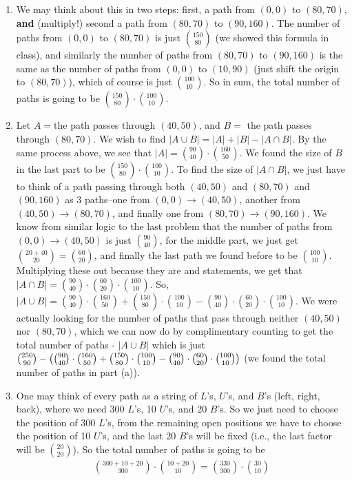 \documentclass[12pt]{article}
\theoremstyle{definition}
\theoremstyle{remark}
\begin{document}
\begin{enumerate}[leftmargin=\labelsep]
\begin{enumerate}
			\item We may think about this in two steps: first, a path from $(0, 0)$ to $(80, 70)$, \textbf{and} (multiply!) second a path from $(80, 70)$ to $(90, 160)$. The number of paths from $(0, 0)$ to $(80, 70)$ is just ${150 \choose 80}$ (we showed this formula in class), and similarly the number of paths from $(80, 70)$ to $(90, 160)$ is the same as the number of paths from $(0, 0)$ to $(10, 90)$ (just shift the origin to $(80, 70)$), which of course is just ${100 \choose 10}$. So in sum, the total number of paths is going to be ${150 \choose 80} \cdot {100 \choose 10}$.
			
			\item Let $A = $the path passes through $(40, 50)$, and $B =$ the path passes through $(80, 70)$. We wish to find $|A \cup B| = |A| + |B| - |A \cap B|$. By the same process above, we see that $|A| = {90 \choose 40} \cdot {160 \choose 50}$. We found the size of $B$ in the last part to be ${150 \choose 80} \cdot {100 \choose 10}$. To find the size of $|A \cap B|$, we just have to think of a path passing through both $(40, 50)$ and $(80, 70)$ and $(90, 160)$ as 3 paths--one from $(0, 0) \to (40, 50)$, another from $(40, 50) \to (80, 70)$, and finally one from $(80, 70) \to (90, 160)$. We know from similar logic to the last problem that the number of paths from $(0, 0) \to (40, 50)$ is just $90 \choose 40$, for the middle part, we just get ${20+40 \choose 20} = {60 \choose 20}$, and finally the last path we found before to be ${100 \choose 10}$. Multiplying these out because they are and statements, we get that $|A \cap B| = {90 \choose 40} \cdot {60 \choose 20} \cdot {100 \choose 10}$. So, $|A \cup B| = {90 \choose 40} \cdot {160 \choose 50} + {150 \choose 80} \cdot {100 \choose 10} - {90 \choose 40} \cdot {60 \choose 20} \cdot {100 \choose 10}$. We were actually looking for the number of paths that pass through neither $(40, 50)$ nor $(80, 70)$, which we can now do by complimentary counting to get the total number of paths - $|A \cup B|$ which is just ${250 \choose 90} - \qty({90 \choose 40} \cdot {160 \choose 50} + {150 \choose 80} \cdot {100 \choose 10} - {90 \choose 40} \cdot {60 \choose 20} \cdot {100 \choose 10})$ (we found the total number of paths in part (a)).
		
			\item One may think of every path as a string of $L$'s, $U$'s, and $B$'s (left, right, back), where we need 300 $L$'s, 10 $U$'s, and 20 $B$'s. So we just need to choose the position of 300 $L$'s, from the remaining open positions we have to choose the position of 10 $U$'s, and the last 20 $B$'s will be fixed (i.e., the last factor will be $20 \choose 20$). So the total number of paths is going to be
			\begin{align*}
				{300+10+20 \choose 300} \cdot {10 + 20 \choose 10} = {330 \choose 300} \cdot {30 \choose 10}
			\end{align*}
		\end{enumerate}
	

\end{enumerate}
\end{document}
